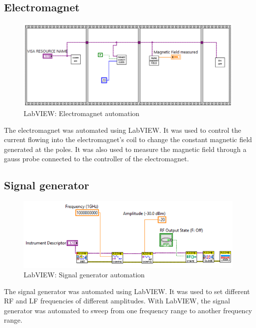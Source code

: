 \documentclass[12pt,a4paper,bold]{thesis}
\theoremstyle{thm}
\theoremstyle{definition}
\begin{document}
\subsection{Electromagnet}
\begin{figure}[H]
	\centering
   \includegraphics[scale=0.56]{Images/49.png} 
   \caption{LabVIEW: Electromagnet automation}
\end{figure}
\indent\indent\indent The electromagnet was automated using LabVIEW. It was used to control the current flowing into the electromagnet's coil to change the constant magnetic field generated at the poles. It was also used to measure the magnetic field through a gauss probe connected to the controller of the electromagnet.
\subsection{Signal generator}
\begin{figure}[H]
	\centering
   \includegraphics[scale=0.56]{Images/50.png} 
   \caption{LabVIEW: Signal generator automation}
\end{figure}
\indent\indent\indent The signal generator was automated using LabVIEW. It was used to set different RF and LF frequencies of different amplitudes. With LabVIEW, the signal generator was automated to sweep from one frequency range to another frequency range.
\end{document}
